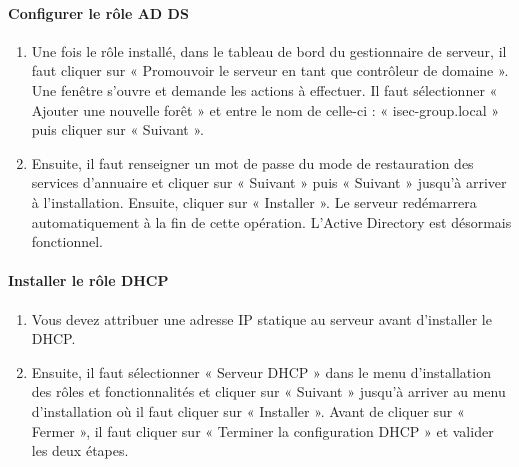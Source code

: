  			\paragraph{Configurer le rôle AD DS}
				\begin{enumerate}
					\item Une fois le rôle installé, dans le tableau de bord du gestionnaire de serveur, il faut cliquer sur « Promouvoir le serveur en tant que contrôleur de domaine ». Une fenêtre s’ouvre et demande les actions à effectuer. Il faut sélectionner « Ajouter une nouvelle forêt » et entre le nom de celle-ci : « isec-group.local » puis cliquer sur « Suivant ». 
					\item Ensuite, il faut renseigner un mot de passe du mode de restauration des services d’annuaire et cliquer sur « Suivant » puis « Suivant » jusqu’à arriver à l’installation. Ensuite, cliquer sur « Installer ». Le serveur redémarrera automatiquement à la fin de cette opération. L’Active Directory est désormais fonctionnel.
				\end{enumerate}

			\paragraph{Installer le rôle DHCP}
				\begin{enumerate}
					\item Vous devez attribuer une adresse IP statique au serveur avant d’installer le DHCP.
					\item Ensuite, il faut sélectionner « Serveur DHCP » dans le menu d’installation des rôles et fonctionnalités et cliquer sur « Suivant » jusqu’à arriver au menu d’installation où il faut cliquer sur « Installer ». Avant de cliquer sur « Fermer », il faut cliquer sur « Terminer la configuration DHCP » et valider les deux étapes.
				\end{enumerate}
